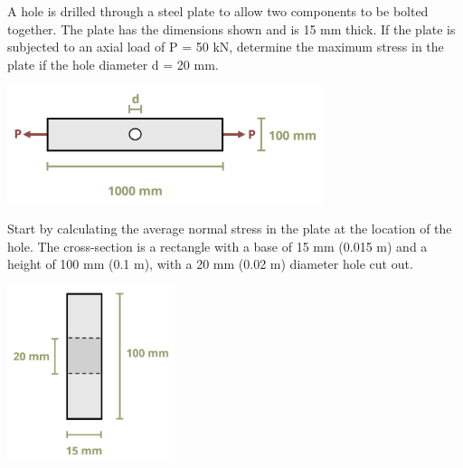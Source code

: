 \documentclass[
  letterpaper,
  DIV=11,
  numbers=noendperiod]{scrreprt}
\begin{document}
\begin{tcolorbox}[enhanced jigsaw, breakable, opacityback=0, toptitle=1mm, left=2mm, colback=white, opacitybacktitle=0.6, colframe=quarto-callout-tip-color-frame, titlerule=0mm, arc=.35mm, leftrule=.75mm, bottomtitle=1mm, colbacktitle=quarto-callout-tip-color!10!white, rightrule=.15mm, title={Example 5.1}, bottomrule=.15mm, toprule=.15mm, coltitle=black]

A hole is drilled through a steel plate to allow two components to be
bolted together. The plate has the dimensions shown and is 15 mm thick.
If the plate is subjected to an axial load of P = 50 kN, determine the
maximum stress in the plate if the hole diameter d = 20 mm.

\begin{center}
\includegraphics[width=3.625in,height=\textheight]{images/PNGs/Example 5.1 part 1.png}
\end{center}

\begin{tcolorbox}[enhanced jigsaw, breakable, opacityback=0, toptitle=1mm, left=2mm, colback=white, opacitybacktitle=0.6, colframe=quarto-callout-tip-color-frame, titlerule=0mm, arc=.35mm, leftrule=.75mm, bottomtitle=1mm, colbacktitle=quarto-callout-tip-color!10!white, rightrule=.15mm, title={Solution}, bottomrule=.15mm, toprule=.15mm, coltitle=black]

Start by calculating the average normal stress in the plate at the
location of the hole. The cross-section is a rectangle with a base of 15
mm (0.015 m) and a height of 100 mm (0.1 m), with a 20 mm (0.02 m)
diameter hole cut out.

\begin{center}
\includegraphics[width=1.92708in,height=\textheight]{images/PNGs/Example 5.1 part 2.png}
\end{center}


\end{tcolorbox}
\end{tcolorbox}
\end{document}
